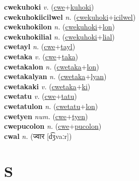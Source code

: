 \textbf{cwekuhoki} \textit{v.} (\hyperref[cwe]{cwe}+\hyperref[kuhoki]{kuhoki})
 \label{cwekuhoki} \\
\textbf{cwekuhokiicilwel} \textit{n.} (\hyperref[cwekuhoki]{cwekuhoki}+\hyperref[icilwel]{icilwel})
 \label{cwekuhokiicilwel} \\
\textbf{cwekuhokilon} \textit{n.} (\hyperref[cwekuhoki]{cwekuhoki}+\hyperref[lon]{lon})
 \label{cwekuhokilon} \\
\textbf{cwekuhokilial} \textit{n.} (\hyperref[cwekuhoki]{cwekuhoki}+\hyperref[lial]{lial})
 \label{cwekuhokilial} \\
\textbf{cwetayl} \textit{n.} (\hyperref[cwe]{cwe}+\hyperref[tayl]{tayl})
 \label{cwetayl} \\
\textbf{cwetaka} \textit{v.} (\hyperref[cwe]{cwe}+\hyperref[taka]{taka})
 \label{cwetaka} \\
\textbf{cwetakalon} \textit{n.} (\hyperref[cwetaka]{cwetaka}+\hyperref[lon]{lon})
 \label{cwetakalon} \\
\textbf{cwetakalyan} \textit{n.} (\hyperref[cwetaka]{cwetaka}+\hyperref[lyan]{lyan})
 \label{cwetakalyan} \\
\textbf{cwetakaki} \textit{v.} (\hyperref[cwetaka]{cwetaka}+\hyperref[ki]{ki})
 \label{cwetakaki} \\
\textbf{cwetatu} \textit{v.} (\hyperref[cwe]{cwe}+\hyperref[tatu]{tatu})
 \label{cwetatu} \\
\textbf{cwetatulon} \textit{n.} (\hyperref[cwetatu]{cwetatu}+\hyperref[lon]{lon})
 \label{cwetatulon} \\
\textbf{cwetyen} \textit{num.} (\hyperref[cwe]{cwe}+\hyperref[tyen]{tyen})
 \label{cwetyen} \\
\textbf{cwepucolon} \textit{n.} (\hyperref[cwe]{cwe}+\hyperref[pucolon]{pucolon})
 \label{cwepucolon} \\
\textbf{cwal} \textit{n.} ({\devanagari{}ज्वार} [d͡ʒvaːr])
 \label{cwal} 

\section{S}

